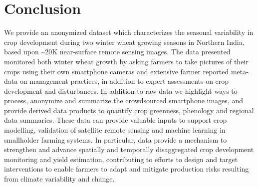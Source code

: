 \documentclass[, manuscript]{copernicus}
\begin{document}
\section{Conclusion}

We provide an anonymized dataset which characterizes the seasonal
variability in crop development during two winter wheat growing seasons
in Northern India, based upon \textasciitilde{}20K near-surface remote
sensing images. The data presented monitored both winter wheat growth by
asking farmers to take pictures of their crops using their own
smartphone cameras and extensive farmer reported meta-data on management
practices, in addition to expert assessments on crop development and
disturbances. In addition to raw data we highlight ways to process,
anonymize and summarize the crowdsourced smartphone images, and provide
derived data products to quantify crop greenness, phenology and regional
data summaries. These data can provide valuable inputs to support crop
modelling, validation of satellite remote sensing and machine learning
in smallholder farming systems. In particular, data provide a mechanism
to strengthen and advance spatially and temporally disaggregated crop
development monitoring and yield estimation, contributing to efforts to
design and target interventions to enable farmers to adapt and mitigate
production risks resulting from climate variability and change.



\end{document}
